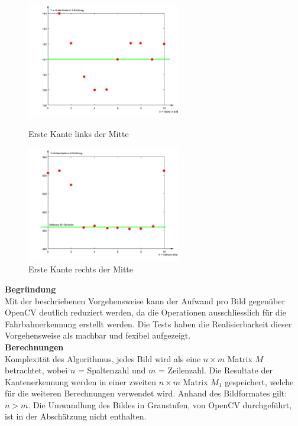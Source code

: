 \begin{figure}[H]
\centering
\includegraphics[width=0.6\textwidth]{03_Loesungskonzept/pictures/minEdge.png}
\caption{Erste Kante links der Mitte}
\includegraphics[width=0.6\textwidth]{03_Loesungskonzept/pictures/maxEdge.png}
\caption{Erste Kante rechts der Mitte}
\label{fig:kanten}
\end{figure}
\textbf{Begründung}\\[0.2cm]
Mit der beschriebenen Vorgehensweise kann der Aufwand pro Bild gegenüber OpenCV deutlich reduziert werden, da die Operationen ausschliesslich für die Fahrbahnerkennung erstellt werden. Die Tests haben die Realisierbarkeit dieser Vorgehensweise als machbar und fexibel aufgezeigt.\\[0.2cm]
\textbf{Berechnungen}\\[0.2cm]
Komplexität des Algorithmus, jedes Bild wird als eine $n\times{m}$ Matrix $M$ betrachtet, wobei $n$ = Spaltenzahl und $m$ = Zeilenzahl. Die Resultate der Kantenerkennung werden in einer zweiten $n\times{m}$ Matrix $M_1$ gespeichert, welche für die weiteren Berechnungen verwendet wird. Anhand des Bildformates gilt: $n>m$. Die Umwandlung des Bildes in Graustufen, von OpenCV durchgeführt, ist in der Abschätzung nicht enthalten.
